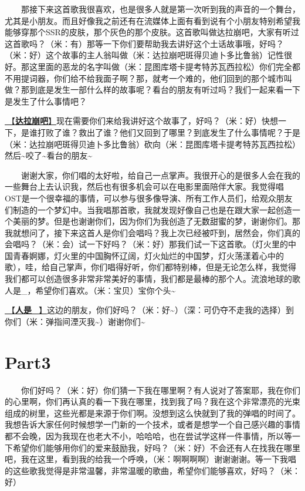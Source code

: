 \documentclass[]{ctexbook}
\begin{document}
  那接下来这首歌我很喜欢，也是很多人就是第一次听到我的声音的一个舞台，尤其是小朋友。而且好像我之前还有在流媒体上面有看到说有个小朋友特别希望我能够穿那个SSR的皮肤，那个灰色的那个皮肤。这首歌叫做达拉崩吧，大家有听过这首歌吗？（米：有）那等一下你们要帮助我去讲好这个土话故事哦，好吗？（米：好）这个故事的主人翁叫做（米：达拉崩吧斑得贝迪卜多比鲁翁）记性很好。那这里面的恶龙的名字叫做（米：昆图库塔卡提考特苏瓦西拉松）你们完全都不用提词器，你们给不给我面子啊？那，就考一个难的，他们回到的那个城市叫做？那到底是发生一部什么样的故事呢？看台的朋友有听过吗？我们一起来看一下是发生了什么事情吧？

\hyperref[dalabengba]{🎵【\textbf{达拉崩吧}】}现在需要你们来给我讲好这个故事了，好吗？（米：好）快想一下，是谁打败了谁？救出了谁？他们又回到了哪里？到底发生了什么事情呢？于是（米：达拉崩吧斑得贝迪卜多比鲁翁）砍向（米：昆图库塔卡提考特苏瓦西拉松）然后\textasciitilde 咬了\textasciitilde 看台的朋友\textasciitilde{}

  谢谢大家，你们唱的太好啦，给自己一点掌声。我很开心的是很多人会在我的一些舞台上去认识我，然后也有很多机会可以在电影里面陪伴大家。我觉得唱OST是一个很幸福的事情，可以参与很多像导演、所有工作人员们，给观众朋友们制造的一个梦幻中。当我唱那首歌，我就发现好像自己也是在跟大家一起创造一个美丽的梦。但是也谢谢你们，因为你们为我创造了无数甜蜜的梦，谢谢你们。那我就想问了，接下来这首人是你们会唱吗？我上次已经被吓到，居然会，你们真的会唱吗？（米：会）试一下好吗？（米：好）那我们试一下这首歌。（灯火里的中国青春婀娜，灯火里的中国胸怀辽阔，灯火灿烂的中国梦，灯火荡漾着心中的歌），哇，给自己掌声，你们唱得好听，你们都特别棒，但是无论怎么样，我觉得我们都可以创造很多非常非常美好的事情，我们都是最棒的那个人。流浪地球的歌人是\_，希望你们喜欢。（米：宝贝）宝你个头\textasciitilde{}

\hyperref[renshi]{🎵【\textbf{人是\_}】}这边的朋友，你们好吗？（米：好\textasciitilde）（深：可仍夺不走我的选择）到你们（米：弹指间湮灭我\textasciitilde）谢谢你们\textasciitilde{}

\section{Part3}\label{nanjing-20240811-part3}

  你们好吗？（米：好）你们猜一下我在哪里啊？有人说对了答案耶，我在你们的心里啊，你们再认真的看一下我在哪里，找到我了吗？我在这个非常漂亮的光束组成的树里，这些光都是来源于你们啊。没想到这么快就到了我的弹唱的时间了。我想告诉大家任何时候想学一门新的一个技术，或者是想学一个自己感兴趣的事情都不会晚，因为我现在也老大不小，哈哈哈，也在尝试学这样一件事情，所以等一下希望你们能够用你们的爱来鼓励我，好吗？（米：好）不会还有人在找我在哪里吧，我在这里，看到我的给我一个呼唤，（米：啊啊啊啊）谢谢谢谢。等一下我唱的这些歌我觉得是非常温馨，非常温暖的歌曲，希望你们能够喜欢，好吗？（米：好）
\end{document}
